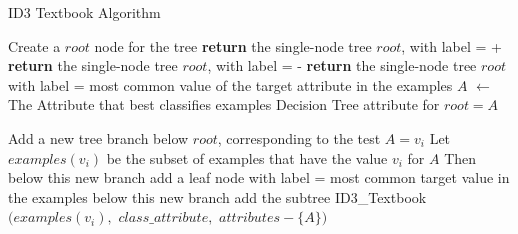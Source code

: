 \begin{algorithm}[H]
\caption{ID3 Textbook Algorithm}\label{a:id3-simple}
\begin{algorithmic}[1]

    \State Create a $root$ node for the tree
        \State \textbf{return} the single-node tree $root$, with label = +
        \State \textbf{return} the single-node tree $root$, with label = -
        \State \textbf{return} the single-node tree $root$ with label = most common value of the target attribute in the examples
    \Else
        \State $A$ $\gets$ The Attribute that best classifies examples
        \State Decision Tree attribute for $root = A$
    
            \State Add a new tree branch below $root$, corresponding to the test $A = v_i$
            \State Let $examples(v_i)$ be the subset of examples that have the value $v_i$ for $A$
                \State Then below this new branch add a leaf node with label = most common target value in the examples
            \Else
                \State below this new branch add the subtree ID3\_Textbook$(examples(v_i),$ $class\_attribute,$ $attributes - \{A\})$
            \EndIf
        \EndFor
    \EndIf
\EndProcedure

\end{algorithmic}
\end{algorithm}



